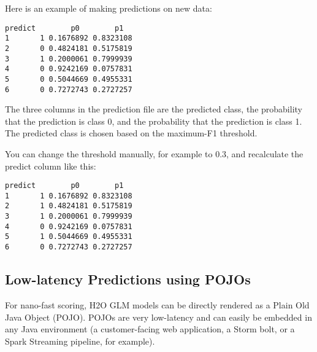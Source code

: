 \waterExampleInR




\waterExampleInPython


\newpage
Here is an example of making predictions on new data:

\waterExampleInR


\waterExampleInPython

\begin{lstlisting}[style=output]
  predict        p0        p1
1       1 0.1676892 0.8323108
2       0 0.4824181 0.5175819
3       1 0.2000061 0.7999939
4       0 0.9242169 0.0757831
5       0 0.5044669 0.4955331
6       0 0.7272743 0.2727257
\end{lstlisting}


The three columns in the prediction file are the predicted class, the probability that the prediction is class 0,
and the probability that the prediction is class 1. The predicted class is chosen based on the maximum-F1 threshold.

You can change the threshold manually, for example to 0.3, and recalculate the predict column like this:



\begin{lstlisting}[style=output]
  predict        p0        p1
1       1 0.1676892 0.8323108
2       1 0.4824181 0.5175819
3       1 0.2000061 0.7999939
4       0 0.9242169 0.0757831
5       1 0.5044669 0.4955331
6       0 0.7272743 0.2727257
\end{lstlisting}

\subsection{Low-latency Predictions using POJOs}

For nano-fast scoring, H2O GLM models can be directly rendered as a Plain Old Java Object (POJO).  POJOs are very
low-latency and can easily be embedded in any Java environment (a customer-facing web application, a Storm bolt,
or a Spark Streaming pipeline, for example).

